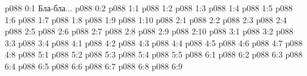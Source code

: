 \author{Яркая Вечерняя Звезда}
\vs p088 0:1  Бла-бла...
\vs p088 0:2 
\vs p088 1:1 
\vs p088 1:2 
\vs p088 1:3 
\vs p088 1:4 
\vs p088 1:5 
\vs p088 1:6 
\vs p088 1:7 
\vs p088 1:8 
\vs p088 1:9 
\vs p088 1:10 
\vs p088 2:1 
\vs p088 2:2 
\vs p088 2:3 
\vs p088 2:4 \pc 
\vs p088 2:5 
\vs p088 2:6 \pc 
\vs p088 2:7 
\vs p088 2:8 
\vs p088 2:9 
\vs p088 2:10 
\vs p088 3:1 
\vs p088 3:2 
\vs p088 3:3 
\vs p088 3:4 
\vs p088 4:1 
\vs p088 4:2 
\vs p088 4:3 
\vs p088 4:4 
\vs p088 4:5 \pc 
\vs p088 4:6 
\vs p088 4:7 
\vs p088 4:8 
\vs p088 5:1 
\vs p088 5:2 
\vs p088 5:3 
\vs p088 5:4 
\vs p088 5:5 
\vs p088 6:1 
\vs p088 6:2 
\vs p088 6:3 
\vs p088 6:4 
\vs p088 6:5 \pc 
\vs p088 6:6 \pc 
\vs p088 6:7 
\vs p088 6:8 
\vsetoff
\vs p088 6:9 
\quizlink
